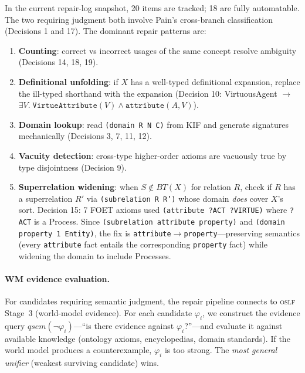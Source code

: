 \documentclass[11pt]{article}
\newcommand{\OSLF}{\textsc{oslf}}
\theoremstyle{definition}
\theoremstyle{plain}
\begin{document}
In the current repair-log snapshot, 20 items are tracked; 18 are fully automatable.
The two requiring judgment
both involve Pain's cross-branch classification (Decisions 1 and 17).
The dominant repair patterns are:
\begin{enumerate}[nosep]
  \item \textbf{Counting}: correct vs incorrect usages of the same
    concept resolve ambiguity (Decisions 14, 18, 19).
  \item \textbf{Definitional unfolding}: if $X$ has a well-typed
    definitional expansion, replace the ill-typed shorthand with
    the expansion (Decision 10: VirtuousAgent $\to$
    $\exists V.\;\texttt{VirtueAttribute}(V) \land
    \texttt{attribute}(A,V)$).
  \item \textbf{Domain lookup}: read \texttt{(domain R N C)} from
    KIF and generate signatures mechanically (Decisions 3, 7, 11, 12).
  \item \textbf{Vacuity detection}: cross-type higher-order axioms
    are vacuously true by type disjointness (Decision 9).
  \item \textbf{Superrelation widening}: when $S \notin
    \mathit{BT}(X)$ for relation $R$, check if $R$ has a
    superrelation $R'$ via \texttt{(subrelation R R')} whose
    domain \emph{does} cover $X$'s sort.  Decision 15: 7 FOET axioms
    used \texttt{(attribute ?ACT ?VIRTUE)} where \texttt{?ACT} is a
    Process.  Since \texttt{(subrelation attribute property)} and
    \texttt{(domain property 1 Entity)}, the fix is
    \texttt{attribute}$\to$\texttt{property}---preserving semantics
    (every \texttt{attribute} fact entails the corresponding
    \texttt{property} fact) while widening the domain to include
    Processes.
\end{enumerate}

\paragraph{WM evidence evaluation.}
For candidates requiring semantic judgment, the repair pipeline
connects to \OSLF{} Stage~3 (world-model evidence).  For each
candidate $\varphi_i$, we construct the evidence query
$\mathit{qsem}(\lnot\varphi_i)$---``is there evidence against
$\varphi_i$?''---and evaluate it against available knowledge
(ontology axioms, encyclopedias, domain standards).  If the world
model produces a counterexample, $\varphi_i$ is too strong.  The
\emph{most general unifier} (weakest surviving candidate) wins.
\end{document}
